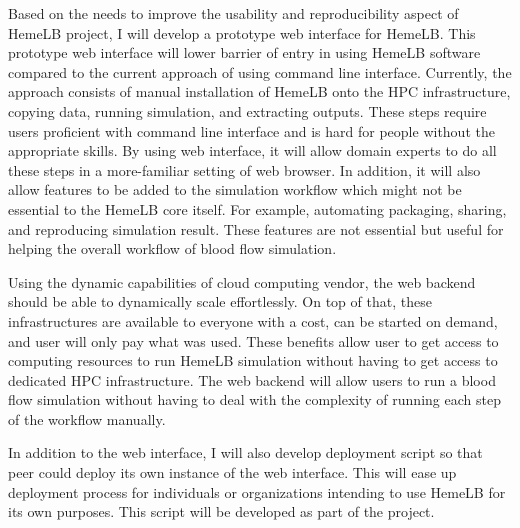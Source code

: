 Based on the needs to improve the usability and reproducibility aspect of HemeLB project, I will develop a prototype web interface for HemeLB. This prototype web interface will lower barrier of entry in using HemeLB software compared to the current approach of using command line interface. Currently, the approach consists of manual installation of HemeLB onto the HPC infrastructure, copying data, running simulation, and extracting outputs. These steps require users proficient with command line interface and is hard for people without the appropriate skills.  By using web interface, it will allow domain experts to do all these steps in a more-familiar setting of web browser. In addition, it will also allow features to be added to the simulation workflow which might not be essential to the HemeLB core itself. For example, automating packaging, sharing, and reproducing simulation result. These features are not essential but useful for helping the overall workflow of blood flow simulation.

Using the dynamic capabilities of cloud computing vendor, the web backend should be able to dynamically scale effortlessly. On top of that, these infrastructures are available to everyone with a cost, can be started on demand, and user will only pay what was used. These benefits allow user to get access to computing resources to run HemeLB simulation without having to get access to dedicated HPC infrastructure. The web backend will allow users to run a blood flow simulation without having to deal with the complexity of running each step of the workflow manually.

In addition to the web interface, I will also develop deployment script so that peer could deploy its own instance of the web interface. This will ease up deployment process for individuals or organizations intending to use HemeLB for its own purposes. This script will be developed as part of the project.



